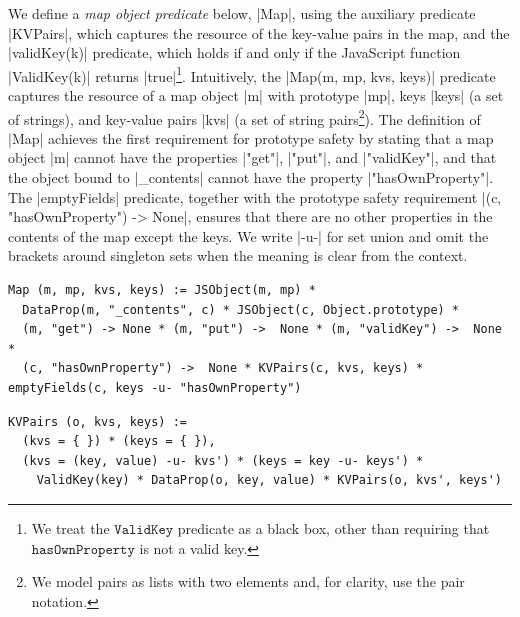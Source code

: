 We define a \emph{map object predicate} below, \jsinline|Map|, using the auxiliary 
predicate \jsinline|KVPairs|, which captures the resource of the key-value pairs in the map, 
and the \jsinline|validKey(k)| predicate, which holds if and only if the JavaScript function \jsinline|ValidKey(k)| returns \jsinline|true|\footnote{We treat the $\mathtt{ValidKey}$ predicate as a black box, other than requiring that $\mathtt{hasOwnProperty}$ is not a valid key.}.
%
Intuitively, the \jsinline|Map(m, mp, kvs, keys)| predicate captures the resource 
of a map object \jsinline|m| with prototype \jsinline|mp|, keys \jsinline|keys| (a set of strings),
and key-value pairs \jsinline|kvs| (a set of string pairs\footnote{We model pairs as lists with two elements and, for clarity, use the pair notation.}).  
%
The definition of \jsinline|Map| achieves the first requirement for prototype safety by stating that a 
map object \jsinline|m| cannot have the properties \jsinline|"get"|, \jsinline|"put"|, and \jsinline|"validKey"|, and that the 
object bound to \jsinline|_contents| cannot have the property \jsinline|"hasOwnProperty"|. 
The \jsinline|emptyFields| predicate, together with the prototype safety requirement \jsinline|(c, "hasOwnProperty") ->  None|, ensures that there are no other properties in the contents of the map except the keys.
%
We write \jsinline|-u-| for set union and omit the brackets around singleton 
sets when the meaning is clear from the context. 
\vspace{3pt}
\begin{center}
{\footnotesize
 \begin{verbatim}
Map (m, mp, kvs, keys) := JSObject(m, mp) * 
  DataProp(m, "_contents", c) * JSObject(c, Object.prototype) * 
  (m, "get") -> None * (m, "put") ->  None * (m, "validKey") ->  None * 
  (c, "hasOwnProperty") ->  None * KVPairs(c, kvs, keys) * emptyFields(c, keys -u- "hasOwnProperty")
  \end{verbatim}
  \vspace*{-0.3cm}
 \begin{verbatim}
KVPairs (o, kvs, keys) := 
  (kvs = { }) * (keys = { }),
  (kvs = (key, value) -u- kvs') * (keys = key -u- keys') * 
    ValidKey(key) * DataProp(o, key, value) * KVPairs(o, kvs', keys')
\end{verbatim}}
\end{center}

